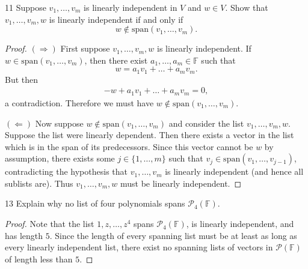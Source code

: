 \documentclass[11pt]{extarticle}
\newenvironment{problem}[1]{\begin{prob*}{#1}{}}{\end{prob*}}
\newcommand{\F}{\mathbb{F}}
\newcommand{\Span}{\mathrm{span}}
\begin{document}
\begin{problem}{11}
Suppose $v_1,\dots, v_m$ is linearly independent in $V$ and $w\in V$.  Show that $v_1,\dots, v_m, w$ is linearly independent if and only if 
\begin{equation*}
w\not\in\Span(v_1,\dots,v_m).
\end{equation*}
\end{problem}
\begin{proof}
$(\Rightarrow)$ First suppose $v_1,\dots, v_m, w$ is linearly independent.  If $w\in\Span(v_1,\dots,v_m)$, then there exist $a_1,\dots, a_m\in\F$ such that
\begin{equation*}
w = a_1v_1 + \dots + a_mv_m.
\end{equation*}
But then 
\begin{align*}
-w + a_1v_1 + \dots + a_mv_m = 0,
\end{align*}
a contradiction.  Therefore we must have $w\not\in\Span(v_1,\dots,v_m)$.
\par $(\Leftarrow)$ Now suppose $w\not\in\Span(v_1,\dots, v_m)$ and consider the list $v_1,\dots,v_m, w$.  Suppose the list were linearly dependent.  Then there exists a vector in the list which is in the span of its predecessors.  Since this vector cannot be $w$ by assumption, there exists some $j\in\{1,\dots, m\}$ such that $v_j\in\Span(v_1,\dots, v_{j-1})$, contradicting the hypothesis that $v_1,\dots, v_m$ is linearly independent (and hence all sublists are).  Thus $v_1,\dots, v_m, w$ must be linearly independent.
\end{proof}

\begin{problem}{13}
Explain why no list of four polynomials spans $\mathcal{P}_4(\F)$.
\end{problem}
\begin{proof}
Note that the list $1, z, \dots, z^4$ spans $\mathcal{P}_4(\F)$, is linearly independent, and has length $5$.  Since the length of every spanning list must be at least as long as every linearly independent list, there exist no spanning lists of vectors in $\mathcal{P}(\F)$ of length less than $5$.
\end{proof}
\end{document}
